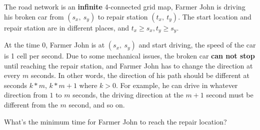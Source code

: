 The road network is an \textbf{infinite} 4-connected grid map, Farmer John is driving his broken car from $(s_x,\ s_y)$ 
to repair station $(t_x,\ t_y)$. The start location and repair station are in different places,
and $t_x \ge s_x, t_y \ge s_y$.

At the time $0$, Farmer John is at $(s_x,\ s_y)$ and start driving, the speed of the car is 1 cell per second.
Due to some mechanical issues, the broken car \textbf{can not stop} until reaching the repair station, and Farmer John has to change the direction at every $m$ seconds.
In other words, the direction of his path should be different at seconds $k*m$, $k*m+1$ where $k>0$.
For example, he can drive in whatever direction from $1$ to $m$ seconds, the driving direction at the $m+1$ second must be different from the $m$ second, and so on.

What's the minimum time for Farmer John to reach the repair location?
